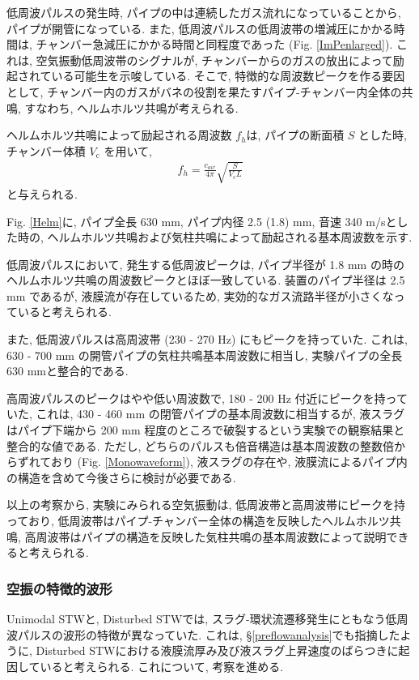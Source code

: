 \documentclass[12pt]{article}
\begin{document}
低周波パルスの発生時, パイプの中は連続したガス流れになっていることから, パイプが開管になっている.  また, 低周波パルスの低周波帯の増減圧にかかる時間は, チャンバー急減圧にかかる時間と同程度であった (Fig. \ref{ImPenlarged}). これは, 空気振動低周波帯のシグナルが, チャンバーからのガスの放出によって励起されている可能生を示唆している. そこで, 特徴的な周波数ピークを作る要因として, チャンバー内のガスがバネの役割を果たすパイプ-チャンバー内全体の共鳴, すなわち, ヘルムホルツ共鳴が考えられる.

ヘルムホルツ共鳴によって励起される周波数 $f_h$は, パイプの断面積 $S$ とした時, チャンバー体積 $V_\mathrm{c}$ を用いて,  
\begin{eqnarray}
f_{h}=\frac{c_{air}}{4\pi} \sqrt{  \frac{S}{V_\mathrm{c} L }   } \label{Helmeq}
\end{eqnarray}
と与えられる. 

Fig. \ref{Helm}に, パイプ全長 630 mm, パイプ内径 2.5 (1.8) mm, 音速 340 m/sとした時の, ヘルムホルツ共鳴および気柱共鳴によって励起される基本周波数を示す. 

低周波パルスにおいて, 発生する低周波ピークは, パイプ半径が 1.8 mm の時のヘルムホルツ共鳴の周波数ピークとほぼ一致している. 装置のパイプ半径は 2.5 mm であるが, 液膜流が存在しているため, 実効的なガス流路半径が小さくなっていると考えられる. 

また, 低周波パルスは高周波帯 (230 - 270 Hz) にもピークを持っていた. これは, 630 - 700 mm の開管パイプの気柱共鳴基本周波数に相当し, 実験パイプの全長 630 mmと整合的である. 

高周波パルスのピークはやや低い周波数で, 180 - 200 Hz 付近にピークを持っていた, これは, 430 - 460 mm の閉管パイプの基本周波数に相当するが, 液スラグはパイプ下端から 200 mm 程度のところで破裂するという実験での観察結果と整合的な値である. ただし, どちらのパルスも倍音構造は基本周波数の整数倍からずれており (Fig. \ref{Monowaveform}), 液スラグの存在や, 液膜流によるパイプ内の構造を含めて今後さらに検討が必要である.

以上の考察から, 実験にみられる空気振動は, 低周波帯と高周波帯にピークを持っており, 低周波帯はパイプ-チャンバー全体の構造を反映したヘルムホルツ共鳴, 高周波帯はパイプの構造を反映した気柱共鳴の基本周波数によって説明できると考えられる.



\subsubsection{空振の特徴的波形}
Unimodal STWと, Disturbed STWでは, スラグ-環状流遷移発生にともなう低周波パルスの波形の特徴が異なっていた. これは, \S \ref{preflowanalysis}でも指摘したように, Disturbed STWにおける液膜流厚み及び液スラグ上昇速度のばらつきに起因していると考えられる. これについて, 考察を進める.
\end{document}
